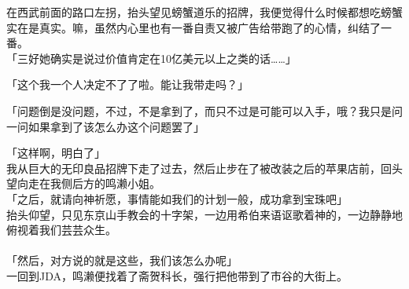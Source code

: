 在西武前面的路口左拐，抬头望见螃蟹道乐的招牌，我便觉得什么时候都想吃螃蟹实在是真实。嘛，虽然内心里也有一番自责又被广告给带跑了的心情，纠结了一番。\\

「三好她确实是说过价值肯定在10亿美元以上之类的话……」

「这个我一个人决定不了了啦。能让我带走吗？」

「问题倒是没问题，不过，不是拿到了，而只不过是可能可以入手，哦？我只是问一问如果拿到了该怎么办这个问题罢了」

「这样啊，明白了」\\

我从巨大的无印良品招牌下走了过去，然后止步在了被改装之后的苹果店前，回头望向走在我侧后方的鸣濑小姐。\\

「之后，就请向神祈愿，事情能如我们的计划一般，成功拿到宝珠吧」\\

抬头仰望，只见东京山手教会的十字架，一边用希伯来语讴歌着神的，一边静静地俯视着我们芸芸众生。\\

\sqsplit\\

「然后，对方说的就是这些，我们该怎么办呢」\\

一回到JDA，鸣濑便找着了斋贺科长，强行把他带到了市谷的大街上。

